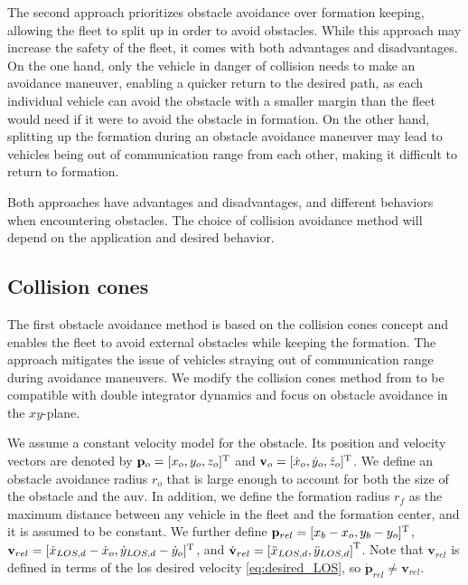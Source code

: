 The second approach prioritizes obstacle avoidance over formation keeping, allowing the fleet to split up in order to avoid obstacles. While this approach may increase the safety of the fleet, it comes with both advantages and disadvantages. On the one hand, only the vehicle in danger of collision needs to make an avoidance maneuver, enabling a quicker return to the desired path, as each individual vehicle can avoid the obstacle with a smaller margin than the fleet would need if it were to avoid the obstacle in formation. On the other hand, splitting up the formation during an obstacle avoidance maneuver may lead to vehicles being out of communication range from each other, making it difficult to return to formation.

Both approaches have advantages and disadvantages, and different behaviors when encountering obstacles. The choice of collision avoidance method will depend on the application and desired behavior.

\subsection{Collision cones}\label{sec:collision_cones}
The first obstacle avoidance method is based on the collision cones concept and enables the fleet to avoid external obstacles while keeping the formation. The approach mitigates the issue of vehicles straying out of communication range during avoidance maneuvers. We modify the collision cones method from \cite{matous_singularity-free_2022} to be compatible with double integrator dynamics and focus on obstacle avoidance in the $xy$-plane.


We assume a constant velocity model for the obstacle. Its position and velocity vectors are denoted by $\mathbf{p}_o = [x_o, y_o, z_o]^{\rm T}$ and $\mathbf{v}_o = [\dot{x}_o, \dot{y}_o, \dot{z}_o]^{\rm T}$. We define an obstacle avoidance radius $r_o$ that is large enough to account for both the size of the obstacle and the \gls{auv}. In addition, we define the formation radius $r_f$ as the maximum distance between any vehicle in the fleet and the formation center, and it is assumed to be constant. We further define $\mathbf{p}_{rel} = [x_b-x_o, y_b-y_o]^{\rm T}$, $\mathbf{v}_{rel} = [\dot{x}_{LOS,d}-\dot{x}_o, \dot{y}_{LOS,d} - \dot{y}_o ]^{\rm T}$, and $\dot{\mathbf{v}}_{rel} = \left[ \ddot{x}_{LOS,d},  \ddot{y}_{LOS,d}\right]^{\rm T}$. Note that $\mathbf{v}_{rel}$ is defined in terms of the \gls{los} desired velocity \eqref{eq:desired_LOS}, so $\dot{\mathbf{p}}_{rel} \neq \mathbf{v}_{rel}$.

